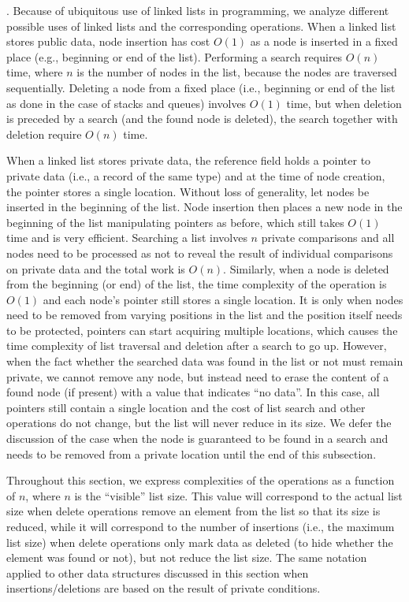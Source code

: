 \documentclass[11pt]{article}
\begin{document}
\medskip {}. Because of ubiquitous use of
linked lists in programming, we analyze different possible uses of linked
lists and the corresponding operations. When a linked list stores public
data, node insertion has cost $O(1)$ as a node is inserted in a fixed place
(e.g., beginning or end of the list). Performing a search requires $O(n)$
time, where $n$ is the number of nodes in the list, because the nodes are
traversed sequentially. Deleting a node from a fixed place (i.e., beginning
or end of the list as done in the case of stacks and queues) involves $O(1)$
time, but when deletion is preceded by a search (and the found node is
deleted), the search together with deletion require $O(n)$ time.

When a linked list stores private data, the reference field holds a pointer
to private data (i.e., a record of the same type) and at the time of node
creation, the pointer stores a single location. Without loss of generality,
let nodes be inserted in the beginning of the list. Node insertion then
places a new node in the beginning of the list manipulating pointers as
before, which still takes $O(1)$ time and is very efficient. Searching a
list involves $n$ private comparisons and all nodes need to be processed as
not to reveal the result of individual comparisons on private data and the
total work is $O(n)$. Similarly, when a node is deleted from the beginning
(or end) of the list, the time complexity of the operation is $O(1)$ and
each node's pointer still stores a single location. It is only when nodes
need to be removed from varying positions in the list and the position
itself needs to be protected, pointers can start acquiring multiple
locations, which causes the time complexity of list traversal and deletion
after a search to go up. However, when the fact whether the searched data
was found in the list or not must remain private, we cannot remove any node,
but instead need to erase the content of a found node (if present) with a
value that indicates ``no data''. In this case, all pointers still contain a
single location and the cost of list search and other operations do not
change, but the list will never reduce in its size. We defer the discussion
of the case when the node is guaranteed to be found in a search and needs to
be removed from a private location until the end of this subsection. 

Throughout this section, we express complexities of the operations as a
function of $n$, where $n$ is the ``visible'' list size. This value will
correspond to the actual list size when delete operations remove an element
from the list so that its size is reduced, while it will correspond to the
number of insertions (i.e., the maximum list size) when delete operations
only mark data as deleted (to hide whether the element was found or not),
but not reduce the list size. The same notation applied to other data
structures discussed in this section when insertions/deletions are based on
the result of private conditions.
\end{document}
